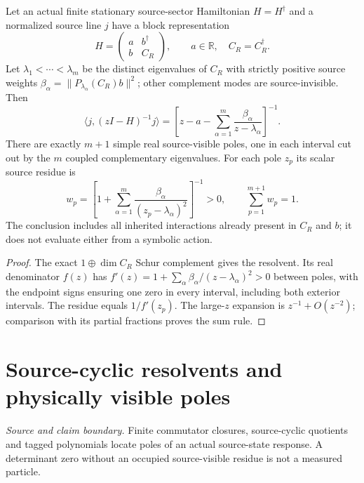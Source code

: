 \documentclass[12pt,a4paper]{article}
\begin{document}
\begin{theorem}
\label{p4b:thm:v240-complete-one-source-stieltjes}
Let an actual finite stationary source-sector Hamiltonian $H=H^\dagger$
and a normalized source line $j$ have a block representation
\[
 H=\begin{pmatrix}a&b^\dagger\\b&C_R\end{pmatrix},
 \qquad a\in\mathbb R,\quad C_R=C_R^\dagger.
\]
Let $\lambda_1<\cdots<\lambda_m$ be the distinct eigenvalues of
$C_R$ with strictly positive source weights
$\beta_\alpha=\|P_{\lambda_\alpha}(C_R)b\|^2$; other complement
modes are source-invisible. Then
\[
 \boxed{\langle j,(zI-H)^{-1}j\rangle
 =\left[z-a-\sum_{\alpha=1}^m
           \frac{\beta_\alpha}{z-\lambda_\alpha}\right]^{-1}.}
\]
There are exactly $m+1$ simple real source-visible poles, one in
each interval cut out by the $m$ coupled complementary eigenvalues.
For each pole $z_p$ its scalar source residue is
\[
 \boxed{w_p=\left[1+\sum_{\alpha=1}^m
       \frac{\beta_\alpha}{(z_p-\lambda_\alpha)^2}\right]^{-1}>0,
       \qquad \sum_{p=1}^{m+1}w_p=1.}
\]
The conclusion includes all inherited interactions already present
in $C_R$ and $b$; it does not evaluate either from a symbolic action.
\end{theorem}
\begin{proof}
The exact $1\oplus\dim C_R$ Schur complement gives the
resolvent. Its real denominator $f(z)$ has
$f'(z)=1+\sum_\alpha\beta_\alpha/(z-\lambda_\alpha)^2>0$
between poles, with the endpoint signs ensuring one zero in every
interval, including both exterior intervals. The residue equals
$1/f'(z_p)$. The large-$z$ expansion is $z^{-1}+O(z^{-2})$;
comparison with its partial fractions proves the sum rule.
\end{proof}




\section{Source-cyclic resolvents and physically visible poles}
\label{p4b:sec:v238-b6}
\noindent\textit{Source and claim boundary.} Finite commutator closures, source-cyclic quotients and tagged polynomials locate poles of an actual source-state response. A determinant zero without an occupied source-visible residue is not a measured particle.
\end{document}
